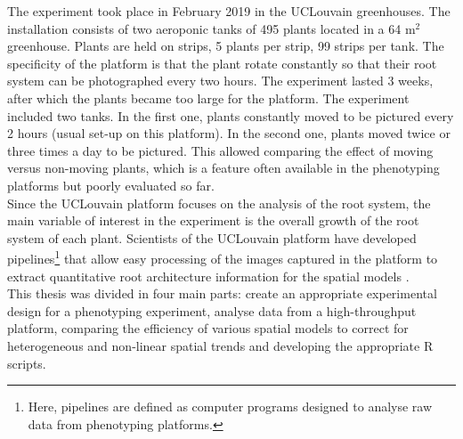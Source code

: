 The experiment took place in February 2019 in the UCLouvain greenhouses. The installation consists of two aeroponic tanks of 495 plants located in a 64 m$^2$ greenhouse. Plants are held on strips, 5 plants per strip, 99 strips per tank. The specificity of 
the platform is that the plant rotate constantly so that their root system can be photographed every two hours.
The experiment lasted 3 weeks, after which the plants became too large for the platform. The experiment included two tanks. In the first one, plants constantly moved to be pictured every 2 hours (usual set-up on this platform). In the second one, plants  moved twice or three times a day to be pictured. This allowed comparing the effect of moving versus non-moving plants, which is a feature often available in the phenotyping platforms but poorly evaluated so far.\\

Since the UCLouvain platform focuses on the analysis of the root system, the main variable of interest in the experiment is the overall growth of the root system of each plant. 
Scientists of the UCLouvain platform have developed pipelines\footnote{Here, pipelines are defined as computer programs designed to analyse raw data from phenotyping platforms.} that allow easy processing of the images captured in the platform to extract quantitative root architecture information for the spatial models \parencite{lobet_novel_2013,lobet_novel_2011}.\\

This thesis was divided in four main parts: create an appropriate experimental design for a phenotyping experiment, analyse data from a high-throughput platform, comparing the efficiency of various spatial models to correct for heterogeneous and non-linear spatial trends and developing the appropriate R scripts.